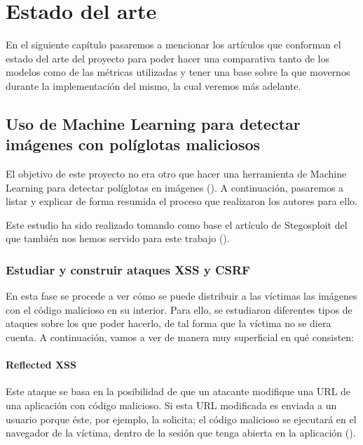 \chapter{Estado del arte}
\label{ch:sota}

En el siguiente capítulo pasaremos a mencionar los artículos que conforman el estado del arte del proyecto para poder hacer una comparativa tanto de los modelos como de las métricas utilizadas y tener una base sobre la que movernos durante la implementación del mismo, la cual veremos más adelante.

\section{Uso de Machine Learning para detectar imágenes con políglotas maliciosos}


El objetivo de este proyecto no era otro que hacer una herramienta de Machine Learning para detectar políglotas en imágenes (\cite{ml-stenography-shawat}). A continuación, pasaremos a listar y explicar de forma resumida el proceso que realizaron los autores para ello. %

Este estudio ha sido realizado tomando como base el artículo de Stegosploit del que también nos hemos servido para este trabajo (\cite{stegosploit}). %

\subsection{Estudiar y construir ataques XSS y CSRF}

En esta fase se procede a ver cómo se puede distribuir a las víctimas las imágenes con el código malicioso en su interior. Para ello, se estudiaron diferentes tipos de ataques sobre los que poder hacerlo, de tal forma que la víctima no se diera cuenta. A continuación, vamos a ver de manera muy superficial en qué consisten:

\subsubsection{Reflected XSS}

Este ataque se basa en la posibilidad de que un atacante modifique una URL de una aplicación con código malicioso. Si esta URL modificada es enviada a un usuario porque éste, por ejemplo, la solicita; el código malicioso se ejecutará en el navegador de la víctima, dentro de la sesión que tenga abierta en la aplicación (\cite{reflected-xss}). %


